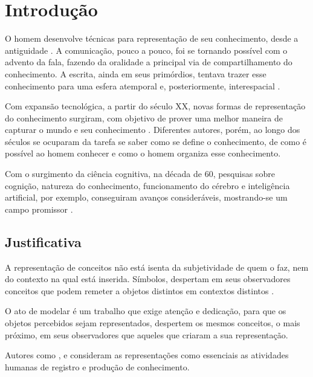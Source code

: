 \chapter{Introdução}
\label{chap:introducao}

O homem desenvolve técnicas para representação de seu conhecimento, desde a antiguidade  \cite{nonato:2009.teoria}. A comunicação, pouco a pouco, foi se tornando possível com o advento da fala, fazendo da oralidade a principal via de compartilhamento do conhecimento. A escrita, ainda em seus primórdios, tentava trazer esse conhecimento para uma esfera atemporal e, posteriormente, interespacial \cite{silva:2011.fala}. 

Com expansão tecnológica, a partir do século XX, novas formas de representação do conhecimento surgiram, com objetivo de prover uma melhor maneira de capturar o mundo e seu conhecimento \cite{nonato:2009.teoria}. Diferentes autores, porém, ao longo dos séculos se ocuparam da tarefa se saber como se define o conhecimento, de como é possível ao homem conhecer e como o homem organiza esse conhecimento.

Com o surgimento da ciência cognitiva, na década de 60, pesquisas sobre cognição, natureza do conhecimento, funcionamento do cérebro e inteligência artificial, por exemplo, conseguiram avanços consideráveis, mostrando-se um campo promissor \cite{lacerda:2012.linguagem}.

\section{\hspace*{3pt} Justificativa}
\label{sec:justificativa}

A representação de conceitos não está isenta da subjetividade de quem o faz, nem do contexto na qual está inserida. Símbolos, despertam em seus observadores conceitos que podem remeter a objetos distintos em contextos distintos \cite{nonato:2009.teoria}.

O ato de modelar é um trabalho que exige atenção e dedicação, para que os objetos percebidos sejam representados, despertem os mesmos  conceitos, o mais próximo, em seus observadores que aqueles que criaram a sua representação. 

Autores como ,  e  consideram as representações como essenciais as atividades humanas de registro e produção de conhecimento.

